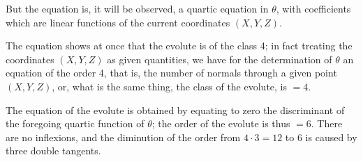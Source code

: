 \documentclass[11pt,a4paper]{article}
\theoremstyle{plain}
\begin{document}
But the equation is, it will be observed, a quartic equation in $\theta$, with coefficients which are linear functions of the current coordinates $(X, Y, Z)$.

The equation shows at once that the evolute is of the class 4; in fact treating the coordinates $(X, Y, Z)$ as given quantities, we have for the determination of $\theta$ an equation of the order 4, that is, the number of normals through a given point $(X, Y, Z)$, or, what is the same thing, the class of the evolute, is $= 4$.

The equation of the evolute is obtained by equating to zero the discriminant of the foregoing quartic function of $\theta$; the order of the evolute is thus $= 6$. There are no inflexions, and the diminution of the order from $4 \cdot 3 = 12$ to 6 is caused by three double tangents.

\vspace{1cm}

\end{document}
